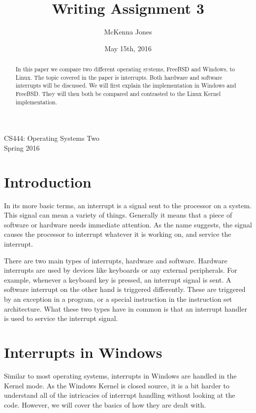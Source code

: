 \documentclass[letterpaper,10pt,titlepage,draftclsnofoot,onecolumn]{IEEEtran}
\title{Writing Assignment 3}
\author{McKenna Jones}
\date{May 15th, 2016}
\begin{document}
\begin{titlepage}
\maketitle
\begin{center}
CS444: Operating Systems Two \\
Spring 2016
\vspace{50 mm}
\end{center}
\begin{abstract}
In this paper we compare two different operating systems, FreeBSD and Windows, to Linux. The topic covered in the paper is interrupts. Both hardware and software interrupts will be discussed. We will first explain the implementation in Windows and FreeBSD. They will then both be compared and contrasted to the Linux Kernel implementation.
\end{abstract}
\end{titlepage}
\section{Introduction}
In its more basic terms, an interrupt is a signal sent to the processor on a system. This signal can mean a variety of things. Generally it means that a piece of software or hardware needs immediate attention. As the name suggests, the signal causes the processor to interrupt whatever it is working on, and service the interrupt.

There are two main types of interrupts, hardware and software. Hardware interrupts are used by devices like keyboards or any external peripherals. For example, whenever a keyboard key is pressed, an interrupt signal is sent. A software interrupt on the other hand is triggered differently. These are triggered by an exception in a program, or a special instruction in the instruction set architecture. What these two types have in common is that an interrupt handler is used to service the interrupt signal. 
 
\section{Interrupts in Windows}
Similar to  most operating systems, interrupts in Windows are handled in the Kernel mode. As the Windows Kernel is closed source, it is a bit harder to understand all of the intricacies of interrupt handling without looking at the code. However, we will cover the basics of how they are dealt with.  
\end{document}
